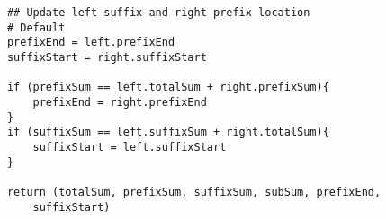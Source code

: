 \documentclass[12pt]{article}
\begin{document}
\begin{enumerate}
\begin{verbatim}
            ## Update left suffix and right prefix location
            # Default
            prefixEnd = left.prefixEnd
            suffixStart = right.suffixStart

            if (prefixSum == left.totalSum + right.prefixSum){
                prefixEnd = right.prefixEnd
            }
            if (suffixSum == left.suffixSum + right.totalSum){
                suffixStart = left.suffixStart
            }

            return (totalSum, prefixSum, suffixSum, subSum, prefixEnd, 
                suffixStart)
    \end{verbatim}

\end{enumerate}
\end{document}
